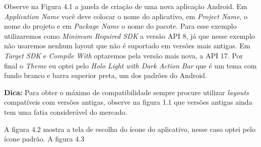 \documentclass[a4paper,12pt,brazil,doubleside]{book}
\begin{document}
\newpage
Observe na Figura 4.1 a janela de criação de uma nova aplicação Android. Em \emph{Application Name} você deve colocar o nome do aplicativo, em \emph{Project Name}, o nome do projeto e em \emph{Package Name} o nome do pacote. Para esse exemplo utilizaremos como \emph{Minimum Required SDK} a versão API 8, já que nesse exemplo não usaremos nenhum layout que não é suportado em versões mais antigas. Em \emph{Target SDK} e \emph{Compile With} optaremos pela versão mais nova, a API 17. Por final o \emph{Theme} eu optei pelo \emph{Holo Light with Dark Action Bar} que é um tema com fundo branco e barra superior preta, um dos padrões do Android.

\begin{framed}
\textbf{Dica:} Para obter o máximo de compatibilidade sempre procure utilizar \emph{layouts} compatíveis com versões antigas, observe na figura 1.1 que versões antigas ainda tem uma fatia considerável do mercado.
\end{framed}

A figura 4.2 mostra a tela de escolha do ícone do aplicativo, nesse caso optei pelo ícone padrão. A figura 4.3 
\end{document}
